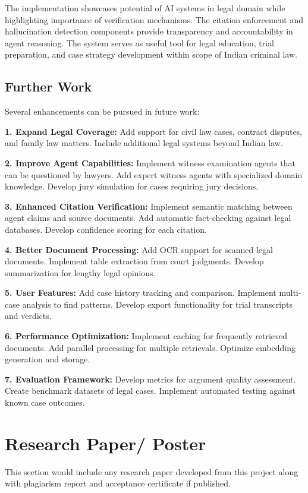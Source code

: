 \documentclass[12pt,singleside,a4paper]{article}
\begin{document}
    The implementation showcases potential of AI systems in legal domain while highlighting importance of verification mechanisms. The citation enforcement and hallucination detection components provide transparency and accountability in agent reasoning. The system serves as useful tool for legal education, trial preparation, and case strategy development within scope of Indian criminal law.

    \subsection{Further Work}
    Several enhancements can be pursued in future work:

    \textbf{1. Expand Legal Coverage:} Add support for civil law cases, contract disputes, and family law matters. Include additional legal systems beyond Indian law.

    \textbf{2. Improve Agent Capabilities:} Implement witness examination agents that can be questioned by lawyers. Add expert witness agents with specialized domain knowledge. Develop jury simulation for cases requiring jury decisions.

    \textbf{3. Enhanced Citation Verification:} Implement semantic matching between agent claims and source documents. Add automatic fact-checking against legal databases. Develop confidence scoring for each citation.

    \textbf{4. Better Document Processing:} Add OCR support for scanned legal documents. Implement table extraction from court judgments. Develop summarization for lengthy legal opinions.

    \textbf{5. User Features:} Add case history tracking and comparison. Implement multi-case analysis to find patterns. Develop export functionality for trial transcripts and verdicts.

    \textbf{6. Performance Optimization:} Implement caching for frequently retrieved documents. Add parallel processing for multiple retrievals. Optimize embedding generation and storage.

    \textbf{7. Evaluation Framework:} Develop metrics for argument quality assessment. Create benchmark datasets of legal cases. Implement automated testing against known case outcomes.

\section{Research Paper/ Poster}
This section would include any research paper developed from this project along with plagiarism report and acceptance certificate if published.
\end{document}
